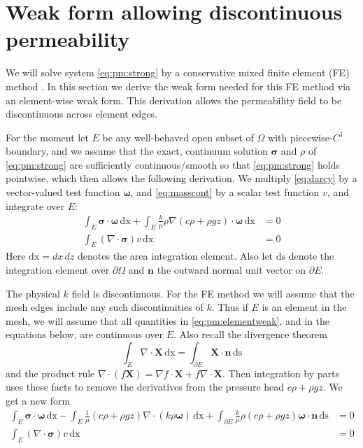\documentclass[11pt]{amsart}
\newcommand{\bn}{\mathbf{n}}
\newcommand{\bX}{\mathbf{X}}
\newcommand{\bsigma}{\bm{\sigma}}
\newcommand{\bomega}{\bm{\omega}}
\newcommand{\dx}{\mathrm{dx}}
\newcommand{\ds}{\mathrm{ds}}
\newcommand{\Div}{\nabla\cdot}
\newcommand{\grad}{\nabla}
\begin{document}
\section{Weak form allowing discontinuous permeability}

We will solve system \eqref{eq:pm:strong} by a conservative mixed finite element (FE) method \citep{Boffi2013}.  In this section we derive the weak form needed for this FE method via an element-wise weak form.  This derivation allows the permeability field to be discontinuous across element edges.

For the moment let $E$ be any well-behaved open subset of $\Omega$ with piecewise-$C^1$ boundary, and we assume that the exact, continuum solution $\bsigma$ and $\rho$ of \eqref{eq:pm:strong} are sufficiently continuous/smooth so that \eqref{eq:pm:strong} holds pointwise, which then allows the following derivation.  We multiply \eqref{eq:darcy} by a vector-valued test function $\bomega$, and \eqref{eq:masscont} by a scalar test function $v$, and integrate over $E$:
\begin{subequations}
\label{eq:pm:elementweak}
\begin{align}
\int_E \bsigma\cdot \bomega\,\dx + \int_E \frac{k}{\mu} \rho \grad\left(c \rho + \rho g z\right) \cdot \bomega\,\dx &= 0 \\
\int_E (\Div \bsigma) v\,\dx &= 0
\end{align}
\end{subequations}
Here $\dx = dx\,dz$ denotes the area integration element.  Also let $\ds$ denote the integration element over $\partial\Omega$ and $\bn$ the outward normal unit vector on $\partial E$.

The physical $k$ field is discontinuous.  For the FE method we will assume that the mesh edges include any such discontinuities of $k$.  Thus if $E$ is an element in the mesh, we will assume that all quantities in \eqref{eq:pm:elementweak}, and in the equations below, are continuous over $E$.  Also recall the divergence theorem
    $$\int_E \Div \bX\,\dx = \int_{\partial E} \bX\cdot \bn\,\ds$$
and the product rule $\Div(f\bX) = \grad f \cdot \bX + f \Div \bX$.  Then integration by parts uses these facts to remove the derivatives from the pressure head $c\rho+\rho g z$.  We get a new form
\begin{subequations}
\label{eq:elementweak:early}
\begin{align}
\int_E \bsigma\cdot \bomega\,\dx - \int_E \frac{1}{\mu} \left(c \rho + \rho g z\right) \Div(k\rho\bomega)\,\dx + \int_{\partial E} \frac{k}{\mu} \rho \left(c \rho + \rho g z\right) \bomega\cdot\bn\,\ds &= 0 \label{eq:elementweak:early:darcy} \\
\int_E (\Div \bsigma) v\,\dx &= 0 \label{eq:elementweak:early:masscont}
\end{align}
\end{subequations}
\end{document}
